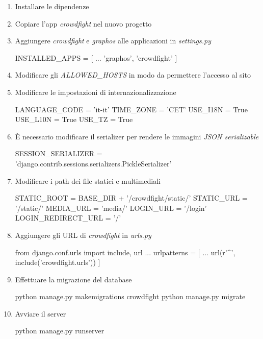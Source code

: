 \documentclass{scrreprt}
\begin{document}
\begin{enumerate}
\item Installare le dipendenze

\item Copiare l'app \textit{crowdfight} nel nuovo progetto

\item Aggiungere \textit{crowdfight} e \textit{graphos} alle applicazioni in \textit{settings.py}
\begin{python}
     INSTALLED_APPS = [
     	...
     	'graphos',
     	'crowdfight'
     ]
\end{python}

\item Modificare gli \textit{ALLOWED_HOSTS} in modo da permettere l'accesso al sito
\item Modificare le impostazioni di internazionalizzazione
\begin{python}
     LANGUAGE_CODE = 'it-it'
     TIME_ZONE = 'CET'
     USE_I18N = True
     USE_L10N = True
     USE_TZ = True
\end{python}

\item È necessario modificare il serializer per rendere le immagini \textit{JSON serializable}
\begin{python}
     SESSION_SERIALIZER =
     'django.contrib.sessions.serializers.PickleSerializer'
\end{python}

\item Modificare i path dei file statici e multimediali
\begin{python}
     STATIC_ROOT = BASE_DIR + '/crowdfight/static/'
     STATIC_URL = '/static/'
     MEDIA_URL = 'media/'
     LOGIN_URL = '/login'
     LOGIN_REDIRECT_URL = '/'
\end{python}

\item Aggiungere gli URL di \textit{crowdfight} in \textit{urls.py}
\begin{python}
     from django.conf.urls import include, url
     ...
     urlpatterns = [
     	...
     	url(r'^', include('crowdfight.urls'))
     ]
\end{python}

\item Effettuare la migrazione del database
\begin{python}
python manage.py makemigrations crowdfight
python manage.py migrate
\end{python}

\item Avviare il server
\begin{python}
python manage.py runserver
\end{python}

\end{enumerate}
\end{document}
